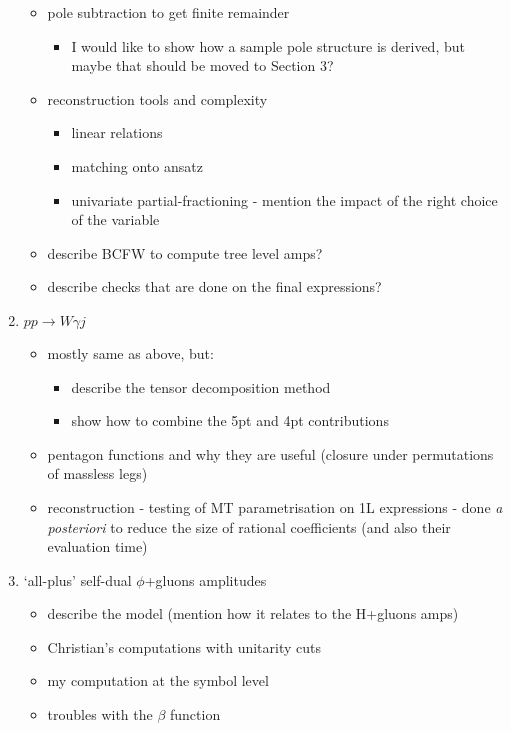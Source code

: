 \documentclass[main.tex]{subfiles}
\begin{document}
\begin{enumerate}
\begin{itemize}
        \item pole subtraction to get finite remainder
        \begin{itemize}
            \item I would like to show how a sample pole structure is derived, but maybe that should be moved to Section 3?
        \end{itemize}
        \item reconstruction tools and complexity
        \begin{itemize}
            \item linear relations
            \item matching onto ansatz
            \item univariate partial-fractioning - mention the impact of the right choice of the variable
        \end{itemize}
        \item describe BCFW to compute tree level amps?
        \item describe checks that are done on the final expressions?
    \end{itemize}
    
    \item $pp \rightarrow W \gamma j$
    \begin{itemize}
        \item mostly same as above, but:
        \begin{itemize}
            \item describe the tensor decomposition method
            \item show how to combine the 5pt and 4pt contributions
        \end{itemize}
        
        \item pentagon functions and why they are useful (closure under permutations of massless legs)
        \item reconstruction - testing of MT parametrisation on 1L expressions - done \textit{a posteriori} to reduce the size of rational coefficients (and also their evaluation time)
    \end{itemize}

    \item `all-plus' self-dual $\phi$+gluons amplitudes
    \begin{itemize}
        \item describe the model (mention how it relates to the H+gluons amps)
        \item Christian's computations with unitarity cuts
        \item my computation at the symbol level
        \item troubles with the $\beta$ function
    \end{itemize}


\end{enumerate}
\end{document}

